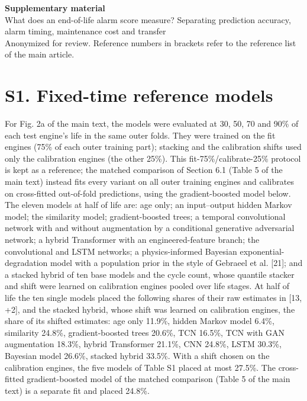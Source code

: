 \documentclass[11pt,a4paper]{article}
\begin{document}
\begin{center}{\Large\bfseries Supplementary material}\\[6pt]{\large What does an end-of-life alarm score measure? Separating prediction accuracy, alarm timing, maintenance cost and transfer}\\[6pt]{\small Anonymized for review. Reference numbers in brackets refer to the reference list of the main article.}\end{center}
\section*{S1. Fixed-time reference models}

\noindent For Fig. 2a of the main text, the models were evaluated at 30, 50, 70 and 90\% of each test engine's life in the same outer folds. They were trained on the fit engines (75\% of each outer training part); stacking and the calibration shifts used only the calibration engines (the other 25\%). This fit-75\%/calibrate-25\% protocol is kept as a reference; the matched comparison of Section 6.1 (Table 5 of the main text) instead fits every variant on all outer training engines and calibrates on cross-fitted out-of-fold predictions, using the gradient-boosted model below. The eleven models at half of life are: age only; an input--output hidden Markov model; the similarity model; gradient-boosted trees; a temporal convolutional network with and without augmentation by a conditional generative adversarial network; a hybrid Transformer with an engineered-feature branch; the convolutional and LSTM networks; a physics-informed Bayesian exponential-degradation model with a population prior in the style of Gebraeel et al. [21]; and a stacked hybrid of ten base models and the cycle count, whose quantile stacker and shift were learned on calibration engines pooled over life stages. At half of life the ten single models placed the following shares of their raw estimates in [\textminus{}13, +2], and the stacked hybrid, whose shift was learned on calibration engines, the share of its shifted estimates: age only 11.9\%, hidden Markov model 6.4\%, similarity 24.8\%, gradient-boosted trees 20.6\%, TCN 16.5\%, TCN with GAN augmentation 18.3\%, hybrid Transformer 21.1\%, CNN 24.8\%, LSTM 30.3\%, Bayesian model 26.6\%, stacked hybrid 33.5\%. With a shift chosen on the calibration engines, the five models of Table S1 placed at most 27.5\%. The cross-fitted gradient-boosted model of the matched comparison (Table 5 of the main text) is a separate fit and placed 24.8\%.
\end{document}
